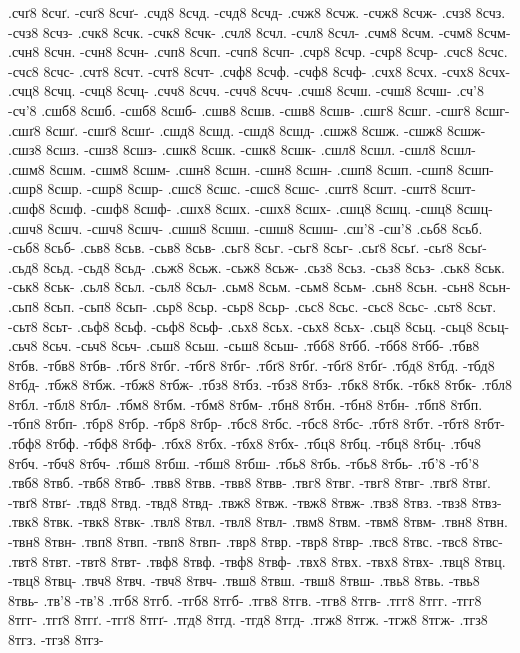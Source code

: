 {.счґ8 8счґ. -счґ8 8счґ-
.счд8 8счд. -счд8 8счд-
.счж8 8счж. -счж8 8счж-
.счз8 8счз. -счз8 8счз-
.счк8 8счк. -счк8 8счк-
.счл8 8счл. -счл8 8счл-
.счм8 8счм. -счм8 8счм-
.счн8 8счн. -счн8 8счн-
.счп8 8счп. -счп8 8счп-
.счр8 8счр. -счр8 8счр-
.счс8 8счс. -счс8 8счс-
.счт8 8счт. -счт8 8счт-
.счф8 8счф. -счф8 8счф-
.счх8 8счх. -счх8 8счх-
.счц8 8счц. -счц8 8счц-
.счч8 8счч. -счч8 8счч-
.счш8 8счш. -счш8 8счш-
.сч'8 -сч'8
.сшб8 8сшб. -сшб8 8сшб-
.сшв8 8сшв. -сшв8 8сшв-
.сшг8 8сшг. -сшг8 8сшг-
.сшґ8 8сшґ. -сшґ8 8сшґ-
.сшд8 8сшд. -сшд8 8сшд-
.сшж8 8сшж. -сшж8 8сшж-
.сшз8 8сшз. -сшз8 8сшз-
.сшк8 8сшк. -сшк8 8сшк-
.сшл8 8сшл. -сшл8 8сшл-
.сшм8 8сшм. -сшм8 8сшм-
.сшн8 8сшн. -сшн8 8сшн-
.сшп8 8сшп. -сшп8 8сшп-
.сшр8 8сшр. -сшр8 8сшр-
.сшс8 8сшс. -сшс8 8сшс-
.сшт8 8сшт. -сшт8 8сшт-
.сшф8 8сшф. -сшф8 8сшф-
.сшх8 8сшх. -сшх8 8сшх-
.сшц8 8сшц. -сшц8 8сшц-
.сшч8 8сшч. -сшч8 8сшч-
.сшш8 8сшш. -сшш8 8сшш-
.сш'8 -сш'8
.сьб8 8сьб. -сьб8 8сьб-
.сьв8 8сьв. -сьв8 8сьв-
.сьг8 8сьг. -сьг8 8сьг-
.сьґ8 8сьґ. -сьґ8 8сьґ-
.сьд8 8сьд. -сьд8 8сьд-
.сьж8 8сьж. -сьж8 8сьж-
.сьз8 8сьз. -сьз8 8сьз-
.ськ8 8ськ. -ськ8 8ськ-
.сьл8 8сьл. -сьл8 8сьл-
.сьм8 8сьм. -сьм8 8сьм-
.сьн8 8сьн. -сьн8 8сьн-
.сьп8 8сьп. -сьп8 8сьп-
.сьр8 8сьр. -сьр8 8сьр-
.сьс8 8сьс. -сьс8 8сьс-
.сьт8 8сьт. -сьт8 8сьт-
.сьф8 8сьф. -сьф8 8сьф-
.сьх8 8сьх. -сьх8 8сьх-
.сьц8 8сьц. -сьц8 8сьц-
.сьч8 8сьч. -сьч8 8сьч-
.сьш8 8сьш. -сьш8 8сьш-
.тбб8 8тбб. -тбб8 8тбб-
.тбв8 8тбв. -тбв8 8тбв-
.тбг8 8тбг. -тбг8 8тбг-
.тбґ8 8тбґ. -тбґ8 8тбґ-
.тбд8 8тбд. -тбд8 8тбд-
.тбж8 8тбж. -тбж8 8тбж-
.тбз8 8тбз. -тбз8 8тбз-
.тбк8 8тбк. -тбк8 8тбк-
.тбл8 8тбл. -тбл8 8тбл-
.тбм8 8тбм. -тбм8 8тбм-
.тбн8 8тбн. -тбн8 8тбн-
.тбп8 8тбп. -тбп8 8тбп-
.тбр8 8тбр. -тбр8 8тбр-
.тбс8 8тбс. -тбс8 8тбс-
.тбт8 8тбт. -тбт8 8тбт-
.тбф8 8тбф. -тбф8 8тбф-
.тбх8 8тбх. -тбх8 8тбх-
.тбц8 8тбц. -тбц8 8тбц-
.тбч8 8тбч. -тбч8 8тбч-
.тбш8 8тбш. -тбш8 8тбш-
.тбь8 8тбь. -тбь8 8тбь-
.тб'8 -тб'8
.твб8 8твб. -твб8 8твб-
.твв8 8твв. -твв8 8твв-
.твг8 8твг. -твг8 8твг-
.твґ8 8твґ. -твґ8 8твґ-
.твд8 8твд. -твд8 8твд-
.твж8 8твж. -твж8 8твж-
.твз8 8твз. -твз8 8твз-
.твк8 8твк. -твк8 8твк-
.твл8 8твл. -твл8 8твл-
.твм8 8твм. -твм8 8твм-
.твн8 8твн. -твн8 8твн-
.твп8 8твп. -твп8 8твп-
.твр8 8твр. -твр8 8твр-
.твс8 8твс. -твс8 8твс-
.твт8 8твт. -твт8 8твт-
.твф8 8твф. -твф8 8твф-
.твх8 8твх. -твх8 8твх-
.твц8 8твц. -твц8 8твц-
.твч8 8твч. -твч8 8твч-
.твш8 8твш. -твш8 8твш-
.твь8 8твь. -твь8 8твь-
.тв'8 -тв'8
.тгб8 8тгб. -тгб8 8тгб-
.тгв8 8тгв. -тгв8 8тгв-
.тгг8 8тгг. -тгг8 8тгг-
.тгґ8 8тгґ. -тгґ8 8тгґ-
.тгд8 8тгд. -тгд8 8тгд-
.тгж8 8тгж. -тгж8 8тгж-
.тгз8 8тгз. -тгз8 8тгз-
}

